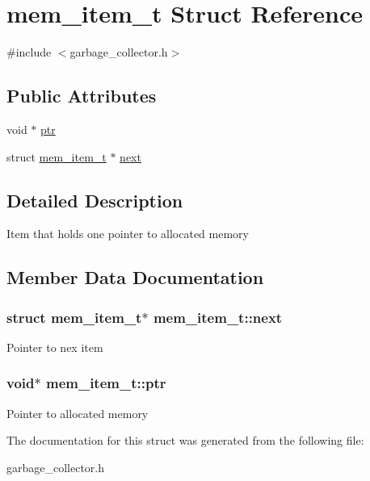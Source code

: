 \hypertarget{structmem__item__t}{}\section{mem\+\_\+item\+\_\+t Struct Reference}
\label{structmem__item__t}


{\ttfamily \#include $<$garbage\+\_\+collector.\+h$>$}

\subsection*{Public Attributes}
\begin{DoxyCompactItemize}
\item 
void $\ast$ \hyperlink{structmem__item__t_a772a66e71369367d17ad83f95cb05334}{ptr}
\item 
struct \hyperlink{structmem__item__t}{mem\+\_\+item\+\_\+t} $\ast$ \hyperlink{structmem__item__t_a0c2420432b5b23b9c9c18ff784ae2ae3}{next}
\end{DoxyCompactItemize}


\subsection{Detailed Description}
Item that holds one pointer to allocated memory 

\subsection{Member Data Documentation}
\hypertarget{structmem__item__t_a0c2420432b5b23b9c9c18ff784ae2ae3}{}
\subsubsection[{next}]{\setlength{\rightskip}{0pt plus 5cm}struct {\bf mem\+\_\+item\+\_\+t}$\ast$ mem\+\_\+item\+\_\+t\+::next}\label{structmem__item__t_a0c2420432b5b23b9c9c18ff784ae2ae3}
Pointer to nex item \hypertarget{structmem__item__t_a772a66e71369367d17ad83f95cb05334}{}
\subsubsection[{ptr}]{\setlength{\rightskip}{0pt plus 5cm}void$\ast$ mem\+\_\+item\+\_\+t\+::ptr}\label{structmem__item__t_a772a66e71369367d17ad83f95cb05334}
Pointer to allocated memory 

The documentation for this struct was generated from the following file\+:\begin{DoxyCompactItemize}
\item 
garbage\+\_\+collector.\+h\end{DoxyCompactItemize}
